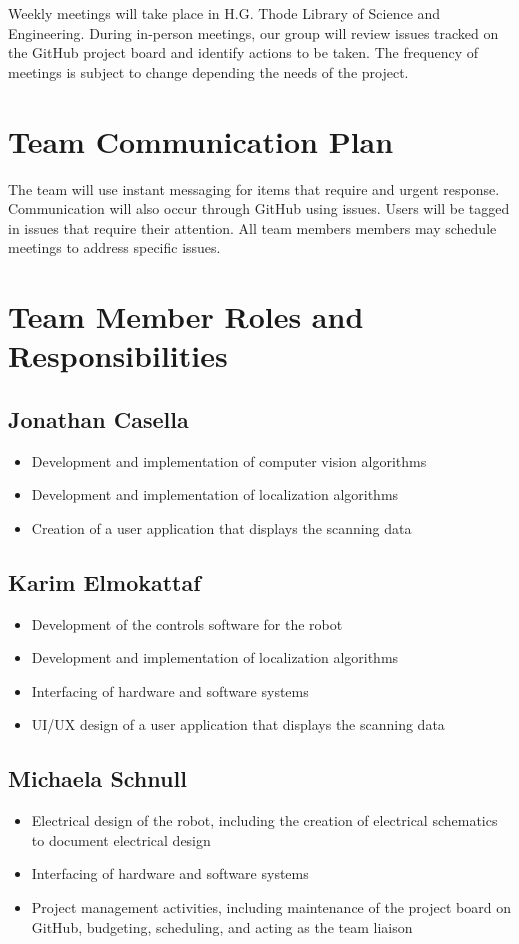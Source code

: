 \documentclass[titlepage]{article}
\begin{document}
Weekly meetings will take place in H.G. Thode Library of Science and Engineering. During in-person meetings, our group will review issues tracked on the GitHub project board and identify actions to be taken. The frequency of meetings is subject to change depending the needs of the project. 

\section{Team Communication Plan}

The team will use instant messaging for items that require and urgent response. Communication will also occur through GitHub using issues. Users will be tagged in issues that require their attention. All team members members may schedule  meetings to address specific issues. 

\section{Team Member Roles and Responsibilities}

\subsection{Jonathan Casella}
\begin{itemize}
\item Development and implementation of computer vision algorithms
\item Development and implementation of localization algorithms
\item Creation of a user application that displays the scanning data
\end{itemize}

\subsection{Karim Elmokattaf}
\begin{itemize}
\item Development of the controls software for the robot
\item Development and implementation of localization algorithms
\item Interfacing of hardware and software systems
\item UI/UX design of a user application that displays the scanning data
\end{itemize}

\subsection{Michaela Schnull}
\begin{itemize}
\item Electrical design of the robot, including the creation of electrical schematics to document electrical design
\item Interfacing of hardware and software systems
\item Project management activities, including maintenance of the project board on GitHub, budgeting, scheduling, and acting as the team liaison
\end{itemize}
\end{document}

